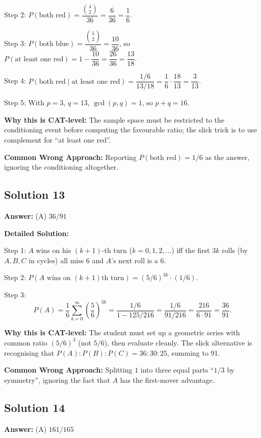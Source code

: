 \documentclass[11pt,a4paper]{article}
\begin{document}
Step 2: \(P(\text{both red}) = \dfrac{\binom{4}{2}}{36} = \dfrac{6}{36} = \dfrac{1}{6}\).

Step 3: \(P(\text{both blue}) = \dfrac{\binom{5}{2}}{36} = \dfrac{10}{36}\), so \(P(\text{at least one red}) = 1 - \dfrac{10}{36} = \dfrac{26}{36} = \dfrac{13}{18}\).

Step 4: \(P(\text{both red} \mid \text{at least one red}) = \dfrac{1/6}{13/18} = \dfrac{1}{6} \cdot \dfrac{18}{13} = \dfrac{3}{13}\).

Step 5: With \(p = 3\), \(q = 13\), \(\gcd(p, q) = 1\), so \(p + q = 16\).

\textbf{Why this is CAT-level:} The sample space must be restricted to the conditioning event before computing the favourable ratio; the slick trick is to use complement for ``at least one red''.

\textbf{Common Wrong Approach:} Reporting \(P(\text{both red}) = 1/6\) as the answer, ignoring the conditioning altogether.

\subsection*{Solution 13}
\textbf{Answer:} (A) \(36/91\)

\textbf{Detailed Solution:}

Step 1: \(A\) wins on his \((k+1)\)-th turn (\(k = 0, 1, 2, \ldots\)) iff the first \(3k\) rolls (by \(A, B, C\) in cycles) all miss 6 and \(A\)'s next roll is a 6.

Step 2: \(P(A \text{ wins on } (k+1)\text{th turn}) = (5/6)^{3k} \cdot (1/6)\).

Step 3: 
\[
P(A) = \frac{1}{6} \sum_{k=0}^{\infty} \left(\frac{5}{6}\right)^{3k} = \frac{1/6}{1 - 125/216} = \frac{1/6}{91/216} = \frac{216}{6 \cdot 91} = \frac{36}{91}.
\]

\textbf{Why this is CAT-level:} The student must set up a geometric series with common ratio \((5/6)^3\) (not \(5/6\)), then evaluate cleanly. The slick alternative is recognising that \(P(A) : P(B) : P(C) = 36 : 30 : 25\), summing to 91.

\textbf{Common Wrong Approach:} Splitting \(1\) into three equal parts ``\(1/3\) by symmetry'', ignoring the fact that \(A\) has the first-mover advantage.

\subsection*{Solution 14}
\textbf{Answer:} (A) \(161/165\)
\end{document}
